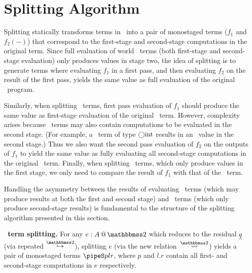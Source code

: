 
\section{Splitting Algorithm}
\label{sec:splitting}

%

\begin{abstrsyn}

Splitting statically transforms terms in \lang\ into a pair of
monostaged terms ($f_1$ and $f_2(-)$) that correspond to the first-stage 
and second-stage computations in the original term. Since full
evaluation of world \bbtwo\ terms (both first-stage and second-stage
evaluation) only produces values in stage two, the idea of splitting
is to generate terms where evaluating $f_1$ in a first pass, and then
evaluating $f_2$ on the result of the first pass, yields the same
value as full evaluation of the original \lang\ program.

Similarly, when splitting \bbonem\ terms, first pass evaluation of
$f_1$ should produce the same value as first-stage evaluation of the
original \lang\ term.  However, complexity arises because
\bbonem\ terms may also contain computations to be evaluated in the
second stage. (For example, a \bbonem\ term of type $\bigcirc {\rm int}$
results in an \rmint\ value in the second stage.) Thus we also want
the second pass evaluation of $f_2$ on the outputs of $f_1$ to yield
the same value as fully evaluating all second-stage computations in
the original \bbonem\ term. Finally, when splitting \bbonep\ terms,
which only produce values in the first stage, we only need to compare
the result of $f_1$ with that of the \lang\ term.

Handling the asymmetry between the results of evaluating
\bbonem\ terms (which may produce results at both the first and second
stage) and \bbtwo\ terms (which only produce second-stage results) is
fundamental to the structure of the splitting algorithm presented in
this section.

\textbf{\bbtwo\ term splitting.}  For any $\coltwo e A$
which reduces to the residual $\underline{q}$ (via repeated $\stepsym \bbtwo$),
splitting $e$ (via the new relation~$\splittwosym$)
yields a pair of monostaged terms $\pipeS p l r$, where $p$ and $l.r$
contain all first- and second-stage computations in $e$ respectively.


\end{abstrsyn}
